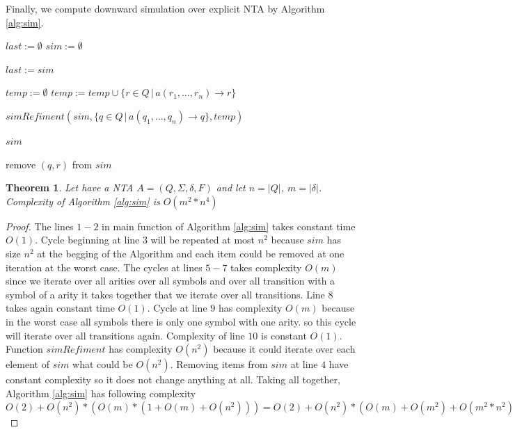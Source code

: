 \documentclass[a4paper, 12pt]{article}
\let\oldnl\nl%
\newcommand{\nonl}{\renewcommand{\nl}{\let\nl\oldnl}}%
\newtheorem{theorem}{Theorem}
\begin{document}
Finally, we compute downward simulation over explicit NTA by Algorithm \ref{alg:sim}.
\begin{algorithm}[h]
\label{alg:sim}
    
	$last := \emptyset $\;
    $sim := \emptyset $\;
	{
		$last := sim$\;
		{
			{
				{
					$temp := \emptyset$\;
					{
						$temp := temp \cup \{r \in Q \,|\, a(r_1,\ldots, r_n) \rightarrow r\}$\;
					}

					$simRefiment(sim, \{q \in Q \,|\, a(q_1,\ldots, q_n) \rightarrow q\}, temp)$\;
				}
			}
		}

	}
	\Return $sim$\;
	\DontPrintSemicolon \nonl\;
	\setcounter{AlgoLine}{0}

	\nonl {}
	{
		{
			{
				{
					remove $(q,r)$ from $sim$ \;
				}
			}
		}
	 }
	 \caption{Computing simulation on a NTA. The algorithm is based on the one in \cite{lengal:trees}}
\end{algorithm}

\begin{theorem}
	\label{the:nfacompl}
Let have a NTA $A = (Q, \Sigma, \delta, F)$ and let $n = |Q|$, $m = |\delta|$.
Complexity of Algorithm \ref{alg:sim} is $O(m^2*n^4)$
\end{theorem}

\begin{proof}
	The lines $1-2$ in main function of Algorithm \ref{alg:sim} takes constant time $O(1)$.
	Cycle beginning at line $3$ will be repeated at most $n^2$ because $sim$ has size $n^2$ at the begging of the Algorithm
	and each item could be removed at one iteration at the worst case.
	The cycles at lines $5-7$ takes complexity $O(m)$ since we iterate over all arities over all symbols and over all transition
	with a symbol of a arity it takes together that we iterate over all transitions.
	Line $8$ takes again constant time $O(1)$.
	Cycle at line $9$ has complexity $O(m)$ because in the worst case all symbols there is only one symbol with one arity.
	so this cycle will iterate over all transitions again.
	Complexity of line $10$ is constant $O(1)$.
	Function $simRefiment$ has complexity $O(n^2)$ because it could iterate over each element of $sim$ what could be $O(n^2)$.
	Removing items from $sim$ at line $4$ have constant complexity so it does not change anything at all.
	Taking all together, Algorithm \ref{alg:sim} has following complexity 
	$O(2) + O(n^2)*(O(m)*(1+O(m)+O(n^2)))=
	O(2) + O(n^2)*(O(m)+O(m^2)+O(m^2*n^2)) =
	O(n^2)*(O(m^2*n^2)) =
	O(m^2*n^4)$
\end{proof}
\end{document}
